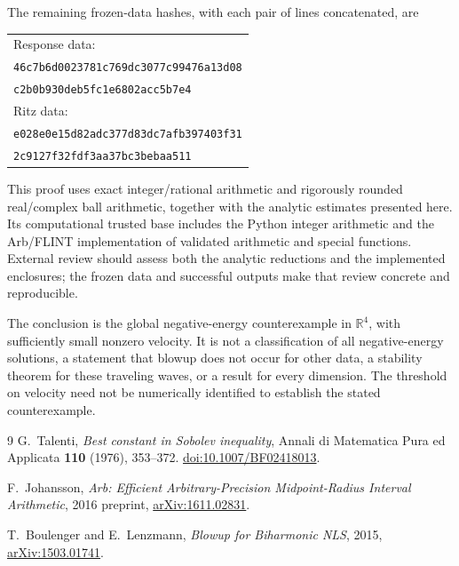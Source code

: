 \documentclass[11pt,a4paper]{article}
\theoremstyle{definition}\newtheorem{definition}[theorem]{Definition}
\theoremstyle{remark}\newtheorem{remark}[theorem]{Remark}
\newcommand{\R}{\mathbb R}
\begin{document}
The remaining frozen-data hashes, with each pair of lines concatenated, are
\begin{center}\small
\begin{tabular}{@{}l@{}}
Response data:\\[-1pt]
\texttt{46c7b6d0023781c769dc3077c99476a13d08}\\
\texttt{c2b0b930deb5fc1e6802acc5b7e4}\\[4pt]
Ritz data:\\[-1pt]
\texttt{e028e0e15d82adc377d83dc7afb397403f31}\\
\texttt{2c9127f32fdf3aa37bc3bebaa511}
\end{tabular}
\end{center}

This proof uses exact integer/rational arithmetic and rigorously rounded real/complex ball arithmetic, together with the analytic estimates presented here. Its computational trusted base includes the Python integer arithmetic and the Arb/FLINT implementation of validated arithmetic and special functions. External review should assess both the analytic reductions and the implemented enclosures; the frozen data and successful outputs make that review concrete and reproducible.

The conclusion is the global negative-energy counterexample in \(\R^4\), with sufficiently small nonzero velocity. It is not a classification of all negative-energy solutions, a statement that blowup does not occur for other data, a stability theorem for these traveling waves, or a result for every dimension. The threshold on velocity need not be numerically identified to establish the stated counterexample.

\begin{thebibliography}{9}
G.~Talenti, \emph{Best constant in Sobolev inequality},
Annali di Matematica Pura ed Applicata \textbf{110} (1976), 353--372.
\href{https://doi.org/10.1007/BF02418013}{doi:10.1007/BF02418013}.

F.~Johansson, \emph{Arb: Efficient Arbitrary-Precision Midpoint-Radius Interval Arithmetic},
2016 preprint, \href{https://arxiv.org/abs/1611.02831}{arXiv:1611.02831}.

T.~Boulenger and E.~Lenzmann, \emph{Blowup for Biharmonic NLS},
2015, \href{https://arxiv.org/abs/1503.01741}{arXiv:1503.01741}.
\end{thebibliography}
\end{document}
